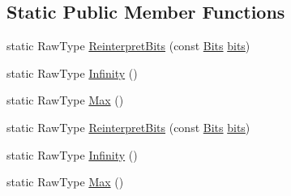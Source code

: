 \subsection*{Static Public Member Functions}
\begin{DoxyCompactItemize}
\item 
static Raw\-Type \hyperlink{classtesting_1_1internal_1_1_floating_point_ac551f793522e54fbd8a25acb79eac5b1}{Reinterpret\-Bits} (const \hyperlink{classtesting_1_1internal_1_1_floating_point_abf228bf6cd48f12c8b44c85b4971a731}{Bits} \hyperlink{classtesting_1_1internal_1_1_floating_point_abead51f16ec6ea84360a976da1cd1387}{bits})
\item 
static Raw\-Type \hyperlink{classtesting_1_1internal_1_1_floating_point_a460027cc19cf01ae8e09cc3796b2b575}{Infinity} ()
\item 
static Raw\-Type \hyperlink{classtesting_1_1internal_1_1_floating_point_aae5954d8a57d3ff0987c6930cb68e114}{Max} ()
\item 
static Raw\-Type \hyperlink{classtesting_1_1internal_1_1_floating_point_ac551f793522e54fbd8a25acb79eac5b1}{Reinterpret\-Bits} (const \hyperlink{classtesting_1_1internal_1_1_floating_point_abf228bf6cd48f12c8b44c85b4971a731}{Bits} \hyperlink{classtesting_1_1internal_1_1_floating_point_abead51f16ec6ea84360a976da1cd1387}{bits})
\item 
static Raw\-Type \hyperlink{classtesting_1_1internal_1_1_floating_point_a460027cc19cf01ae8e09cc3796b2b575}{Infinity} ()
\item 
static Raw\-Type \hyperlink{classtesting_1_1internal_1_1_floating_point_aae5954d8a57d3ff0987c6930cb68e114}{Max} ()
\end{DoxyCompactItemize}
